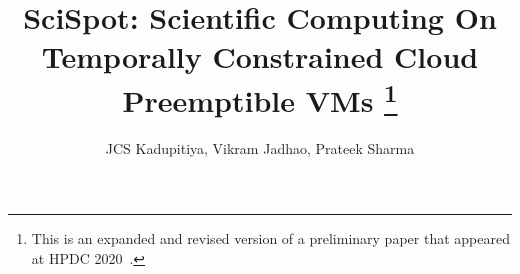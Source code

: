 \documentclass[compsoc]{IEEEtran}
\begin{document}
\title{SciSpot: Scientific Computing On Temporally Constrained Cloud Preemptible VMs \thanks{{This is an expanded and revised version of a preliminary paper that appeared at HPDC 2020~\cite{scispot-hpdc20}.}}}

\author{JCS Kadupitiya, Vikram Jadhao, Prateek Sharma}
\maketitle 


\begin{abstract}
  
\end{abstract}





%





%

%







%






{


%
}


\end{document}
